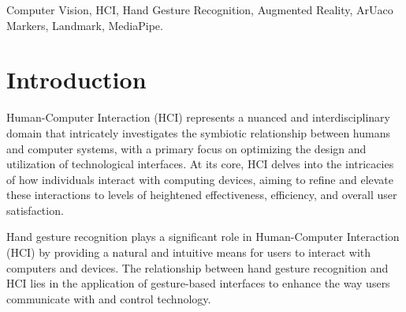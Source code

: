 \documentclass[journal]{IEEEtran}
\begin{document}
\begin{IEEEkeywords}
Computer Vision, HCI, Hand Gesture Recognition, Augmented Reality, ArUaco Markers, Landmark, MediaPipe.
\end{IEEEkeywords}






%
\IEEEpeerreviewmaketitle



% 
% 
% 
% 
\section{Introduction}

 Human-Computer Interaction (HCI) represents a nuanced and interdisciplinary domain that intricately 
investigates the symbiotic relationship between humans and computer systems, with a primary focus on optimizing the design 
and utilization of technological interfaces. At its core, HCI delves into the intricacies of how individuals interact with 
computing devices, aiming to refine and elevate these interactions to levels of heightened effectiveness, efficiency, and 
overall user satisfaction.


Hand gesture recognition plays a significant role in Human-Computer Interaction (HCI) by providing a natural and intuitive means 
for users to interact with computers and devices. The relationship between hand gesture recognition and HCI lies in the application 
of gesture-based interfaces to enhance the way users communicate with and control technology. 
\end{document}
